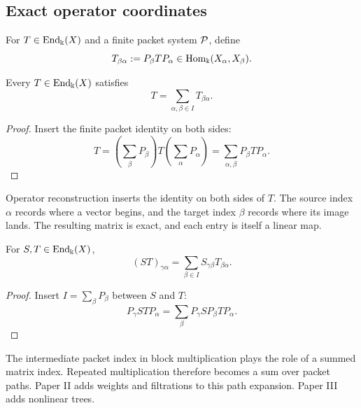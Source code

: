 \subsection{Exact operator coordinates}

\begin{definition}
\label{def:transfer-block}
For $T\in\operatorname{End}_{\Bbbk}(X)$ and a finite packet system $\mathcal P$, define
\[
T_{\beta\alpha}:=P_\beta TP_\alpha
\in\operatorname{Hom}_{\Bbbk}(X_\alpha,X_\beta).
\]
\end{definition}

\begin{theorem}
\label{thm:operator-reconstruction}
Every $T\in\operatorname{End}_{\Bbbk}(X)$ satisfies
\[
\boxed{T=\sum_{\alpha,\beta\in I}T_{\beta\alpha}.}
\]
\end{theorem}

\begin{proof}
Insert the finite packet identity on both sides:
\[
T=
\left(\sum_\beta P_\beta\right)
T
\left(\sum_\alpha P_\alpha\right)
=
\sum_{\alpha,\beta}P_\beta TP_\alpha.
\]
\end{proof}

\begin{interpretation}
Operator reconstruction inserts the identity on both sides of \(T\).  The source index \(\alpha\) records where a vector begins, and the target index \(\beta\) records where its image lands.  The resulting matrix is exact, and each entry is itself a linear map.
\end{interpretation}


\begin{theorem}
\label{thm:block-multiplication}
For $S,T\in\operatorname{End}_{\Bbbk}(X)$,
\[
\boxed{
(ST)_{\gamma\alpha}
=
\sum_{\beta\in I}S_{\gamma\beta}T_{\beta\alpha}.
}
\]
\end{theorem}

\begin{proof}
Insert $I=\sum_\beta P_\beta$ between $S$ and $T$:
\[
P_\gamma STP_\alpha
=
\sum_\beta
P_\gamma SP_\beta TP_\alpha.
\]
\end{proof}

\begin{keyidea}
The intermediate packet index in block multiplication plays the role of a summed matrix index.  Repeated multiplication therefore becomes a sum over packet paths.  Paper II adds weights and filtrations to this path expansion.  Paper III adds nonlinear trees.
\end{keyidea}


